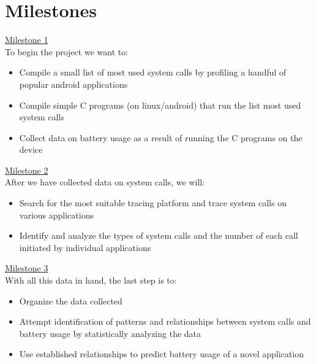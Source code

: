 \documentclass[11pt]{article}
\begin{document}
\section{Milestones}
\uline{Milestone 1}\\
To begin the project we want to: 
\begin{itemize}
  \item Compile a small list of most used system calls by profiling a handful of popular android applications
  \item Compile simple C programs (on linux/android) that run the list most used system calls
  \item Collect data on battery usage as a result of running the C programs on the device
\end{itemize}

\noindent
\uline{Milestone 2}\\
After we have collected data on system calls, we will:
\begin{itemize}
  \item Search for the most suitable tracing platform and trace system calls on various applications 
  \item Identify and analyze the types of system calls and the number of each call initiated by individual applications
\end{itemize}

\noindent
\uline{Milestone 3}\\
With all this data in hand, the last step is to:
\begin{itemize}
  \item Organize the data collected
  \item Attempt identification of patterns and relationships between system calls and battery usage by statistically analyzing the data
  \item Use established relationships to predict battery usage of a novel application
\end{itemize}



\end{document}
